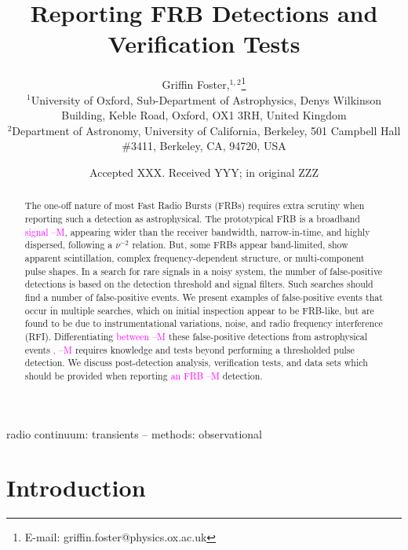 \documentclass[a4paper,fleqn,usenatbib]{mnras}
\title[FRB Detections and Verification Tests]{Reporting FRB Detections
and Verification Tests}
\author[G. Foster et al.]{
Griffin Foster,$^{1,2}$\thanks{E-mail: griffin.foster@physics.ox.ac.uk}
\\
$^{1}$University of Oxford, Sub-Department of Astrophysics, Denys Wilkinson Building, Keble Road, Oxford, OX1 3RH, United Kingdom\\
$^{2}$Department of Astronomy, University of California, Berkeley, 501 Campbell
Hall \#3411, Berkeley, CA, 94720, USA\\
}
\date{Accepted XXX. Received YYY; in original ZZZ}
\newcommand{\cM}[1]{\textcolor{magenta}{ #1 --M}}
\begin{document}
\label{firstpage}
\pagerange{\pageref{firstpage}--\pageref{lastpage}}
\maketitle

\begin{abstract}
The one-off nature of most Fast Radio Bursts (FRBs) requires extra scrutiny when
reporting such a detection as astrophysical.  The prototypical FRB is a
broadband \cM{signal}, appearing wider than the receiver bandwidth, narrow-in-time, and
highly dispersed, following a $\nu^{-2}$ relation.  But, some FRBs appear
band-limited, show apparent scintillation, complex frequency-dependent
structure, or multi-component pulse shapes.  In a search for rare signals in a
noisy system, the number of false-positive detections is based on the detection
threshold and signal filters.  Such searches should find a number of
false-positive events.  We present examples of false-positive events that occur
in multiple searches, which on initial inspection appear to be FRB-like, but are
found to be due to instrumentational variations, noise, and radio frequency
interference (RFI).  Differentiating \cM{between} these false-positive detections from
astrophysical events\cM{,} requires knowledge and tests beyond performing a
thresholded pulse detection.  We discuss post-detection analysis, verification
tests, and data sets which should be provided when reporting \cM{an FRB} detection.
\end{abstract}

\begin{keywords}
radio continuum: transients -- methods: observational
\end{keywords}


\section{Introduction}
\label{sec:intro}
\end{document}
